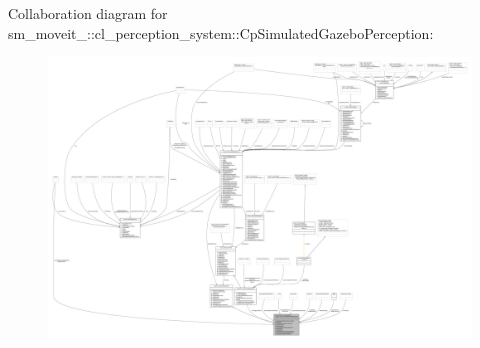 Collaboration diagram for sm\+\_\+moveit\+\_\+:\+:cl\+\_\+perception\+\_\+system\+:\+:Cp\+Simulated\+Gazebo\+Perception\+:
\nopagebreak
\begin{figure}[H]
\begin{center}
\leavevmode
\includegraphics[width=350pt]{classsm__moveit__4_1_1cl__perception__system_1_1CpSimulatedGazeboPerception__coll__graph}
\end{center}
\end{figure}
